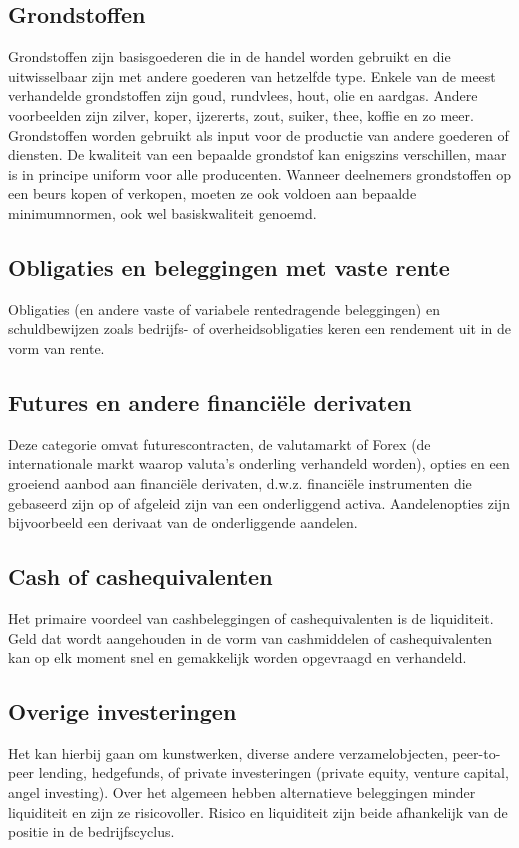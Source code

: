 \subsection{Grondstoffen}
Grondstoffen zijn basisgoederen die in de handel worden gebruikt en die uitwisselbaar zijn met andere goederen van hetzelfde type.
Enkele van de meest verhandelde grondstoffen zijn goud, rundvlees, hout, olie en aardgas. Andere voorbeelden zijn zilver, koper, ijzererts, zout, suiker, thee, koffie en zo meer. Grondstoffen worden gebruikt als input voor de productie van andere goederen of diensten. De kwaliteit van een bepaalde grondstof kan enigszins verschillen, maar is in principe uniform voor alle producenten. Wanneer deelnemers grondstoffen op een beurs kopen of verkopen, moeten ze ook voldoen aan bepaalde minimumnormen, ook wel basiskwaliteit genoemd.

\subsection{Obligaties en beleggingen met vaste rente}
Obligaties (en andere vaste of variabele rentedragende beleggingen) en schuldbewijzen zoals bedrijfs- of overheidsobligaties keren een rendement uit in de vorm van rente. 

\subsection{Futures en andere financi\"ele derivaten}
Deze categorie omvat futurescontracten, de valutamarkt of Forex (de internationale markt waarop valuta's onderling verhandeld worden), opties en een groeiend aanbod aan financi\"ele derivaten, d.w.z. financi\"ele instrumenten die gebaseerd zijn op of afgeleid zijn van een onderliggend activa. Aandelenopties zijn bijvoorbeeld een derivaat van de onderliggende aandelen.

\subsection{Cash of cashequivalenten}
Het primaire voordeel van cashbeleggingen of cashequivalenten is de liquiditeit. Geld dat wordt aangehouden in de vorm van cashmiddelen of cashequivalenten kan op elk moment snel en gemakkelijk worden opgevraagd en verhandeld. 
\subsection{Overige investeringen}
Het kan hierbij gaan om kunstwerken, diverse andere verzamelobjecten, peer-to-peer lending, hedgefunds, of private investeringen (private equity, venture capital, angel investing). 
Over het algemeen hebben alternatieve beleggingen minder liquiditeit en zijn ze risicovoller. Risico en liquiditeit zijn beide afhankelijk van de positie in de bedrijfscyclus. 

